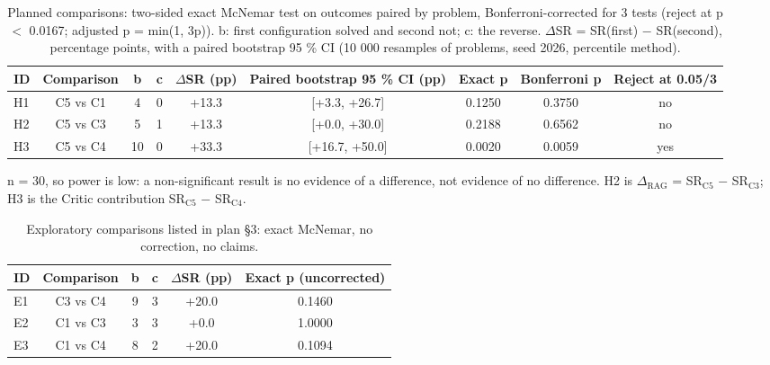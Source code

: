 \begin{table}[t]
\centering
\scriptsize
\setlength{\tabcolsep}{3pt}
\caption{Planned comparisons: two-sided exact McNemar test on outcomes paired by problem, Bonferroni-corrected for 3 tests (reject at p $<$ 0.0167; adjusted p = min(1, 3p)). b: first configuration solved and second not; c: the reverse. $\Delta$SR = SR(first) $-$ SR(second), percentage points, with a paired bootstrap 95 \% CI (10 000 resamples of problems, seed 2026, percentile method).}
\label{tab:mcnemar}
\begin{tabular}{lcccccccc}
\toprule
ID & Comparison & b & c & $\Delta$SR (pp) & Paired bootstrap 95 \% CI (pp) & Exact p & Bonferroni p & Reject at 0.05/3 \\
\midrule
H1 & C5 vs C1 & 4 & 0 & +13.3 & {[}+3.3, +26.7{]} & 0.1250 & 0.3750 & no \\
H2 & C5 vs C3 & 5 & 1 & +13.3 & {[}+0.0, +30.0{]} & 0.2188 & 0.6562 & no \\
H3 & C5 vs C4 & 10 & 0 & +33.3 & {[}+16.7, +50.0{]} & 0.0020 & 0.0059 & yes \\
\bottomrule
\end{tabular}

\vspace{2pt}
\parbox{\linewidth}{\scriptsize n = 30, so power is low: a non-significant result is no evidence of a difference, not evidence of no difference. H2 is $\Delta_{\mathrm{RAG}}$ = SR$_{\mathrm{C5}}$ $-$ SR$_{\mathrm{C3}}$; H3 is the Critic contribution SR$_{\mathrm{C5}}$ $-$ SR$_{\mathrm{C4}}$.}
\end{table}

\begin{table}[t]
\centering
\footnotesize
\setlength{\tabcolsep}{3pt}
\caption{Exploratory comparisons listed in plan §3: exact McNemar, no correction, no claims.}
\label{tab:mcnemar-expl}
\begin{tabular}{lccccc}
\toprule
ID & Comparison & b & c & $\Delta$SR (pp) & Exact p (uncorrected) \\
\midrule
E1 & C3 vs C4 & 9 & 3 & +20.0 & 0.1460 \\
E2 & C1 vs C3 & 3 & 3 & +0.0 & 1.0000 \\
E3 & C1 vs C4 & 8 & 2 & +20.0 & 0.1094 \\
\bottomrule
\end{tabular}
\end{table}

